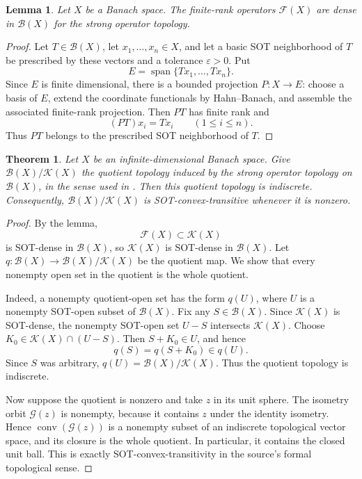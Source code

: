 \documentclass[11pt]{article}
\newtheorem{theorem}{Theorem}
\newtheorem{lemma}{Lemma}
\newcommand{\B}{\mathcal B}
\newcommand{\K}{\mathcal K}
\newcommand{\F}{\mathcal F}
\begin{document}
\begin{lemma}
Let \(X\) be a Banach space. The finite-rank operators \(\F(X)\) are dense in
\(\B(X)\) for the strong operator topology.
\end{lemma}

\begin{proof}
Let \(T\in\B(X)\), let \(x_1,\ldots,x_n\in X\), and let a basic SOT
neighborhood of \(T\) be prescribed by these vectors and a tolerance
\(\varepsilon>0\). Put
\[
  E=\operatorname{span}\{Tx_1,\ldots,Tx_n\}.
\]
Since \(E\) is finite dimensional, there is a bounded projection \(P:X\to E\):
choose a basis of \(E\), extend the coordinate functionals by Hahn--Banach,
and assemble the associated finite-rank projection. Then \(PT\) has finite
rank and
\[
  (PT)x_i = Tx_i \qquad (1\le i\le n).
\]
Thus \(PT\) belongs to the prescribed SOT neighborhood of \(T\).
\end{proof}

\begin{theorem}
Let \(X\) be an infinite-dimensional Banach space. Give
\(\B(X)/\K(X)\) the quotient topology induced by the strong operator topology
on \(\B(X)\), in the sense used in \cite{Talponen2011}. Then this quotient
topology is indiscrete. Consequently, \(\B(X)/\K(X)\) is SOT-convex-transitive
whenever it is nonzero.
\end{theorem}

\begin{proof}
By the lemma,
\[
  \F(X)\subset \K(X)
\]
is SOT-dense in \(\B(X)\), so \(\K(X)\) is SOT-dense in \(\B(X)\).
Let \(q:\B(X)\to\B(X)/\K(X)\) be the quotient map. We show that every nonempty
open set in the quotient is the whole quotient.

Indeed, a nonempty quotient-open set has the form \(q(U)\), where \(U\) is a
nonempty SOT-open subset of \(\B(X)\). Fix any \(S\in\B(X)\). Since
\(\K(X)\) is SOT-dense, the nonempty SOT-open set \(U-S\) intersects
\(\K(X)\). Choose \(K_0\in\K(X)\cap(U-S)\). Then \(S+K_0\in U\), and hence
\[
  q(S)=q(S+K_0)\in q(U).
\]
Since \(S\) was arbitrary, \(q(U)=\B(X)/\K(X)\). Thus the quotient topology is
indiscrete.

Now suppose the quotient is nonzero and take \(z\) in its unit sphere. The
isometry orbit \(\mathcal G(z)\) is nonempty, because it contains \(z\) under
the identity isometry. Hence \(\operatorname{conv}(\mathcal G(z))\) is a
nonempty subset of an indiscrete topological vector space, and its closure is
the whole quotient. In particular, it contains the closed unit ball. This is
exactly SOT-convex-transitivity in the source's formal topological sense.
\end{proof}
\end{document}
